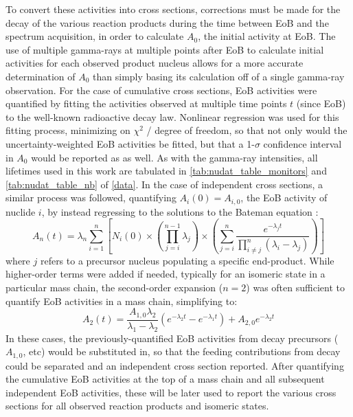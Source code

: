 \documentclass[3p]{elsarticle}
\newcommand{\pp}[1]{\left( #1\right)}
\begin{document}
To convert these activities into cross sections, corrections must be made for the decay of the various reaction products during the time between EoB and the spectrum acquisition, in order to calculate $A_0$, the initial activity at EoB.
The use of  multiple gamma-rays at multiple points after EoB to calculate initial activities  for each observed product nucleus allows for a more accurate  determination of $A_0$ than simply basing its calculation off of a single gamma-ray observation.
For the case of cumulative cross sections, EoB activities were quantified by fitting the activities observed at multiple time points $t$ (since EoB) to the well-known radioactive decay law.
Nonlinear regression was used for this fitting process, minimizing on $\chi^2$ / degree of freedom, so that not only would the uncertainty-weighted EoB activities be fitted, but that a 1-$\sigma$ confidence interval in $A_0$ would be reported as as well.
As with the gamma-ray intensities, all lifetimes used in this work are tabulated in \autoref{tab:nudat_table_monitors} and \autoref{tab:nudat_table_nb} of \ref{data}.
In the case of independent cross sections, a similar process was followed, quantifying $A_i\pp{0} = A_{i,0}$, the EoB activity of nuclide $i$, by instead regressing to the solutions to the Bateman equation \cite{bateman1910solution,Cetnar2006}:
\begin{equation}
A_n\pp{t} = \lambda_n \sum_{i=1}^n \left[  N_i\pp{0} \times \pp{\prod_{j=i}^{n-1}\lambda_j} \times \pp{\sum_{j=i}^n \dfrac{e^{-\lambda_j t}}{\prod_{i\neq j}^n \pp{\lambda_i - \lambda_j}}  }   \right]
\end{equation}
where $j$ refers to a precursor nucleus populating a specific end-product.  
While higher-order terms were added if needed, typically for an isomeric state in a particular mass chain,  the second-order expansion ($n=2$) was often sufficient to quantify EoB activities in a mass chain, simplifying to:
\begin{equation}
A_2\pp{t} = \dfrac{A_{1,0}\lambda_2}{\lambda_1 - \lambda_2} \pp{e^{-\lambda_2 t} - e^{-\lambda_1 t}} + A_{2,0} e^{-\lambda_2 t}
\end{equation}
In these cases, the previously-quantified EoB activities from decay precursors ($A_{1,0}$, etc) would be substituted in, so that the feeding contributions from decay could be separated and an independent cross section reported.
After quantifying the cumulative EoB activities at the top of a mass chain and all subsequent independent EoB activities, these will be later used to report the various cross sections for all observed reaction products and isomeric states. 
\end{document}
